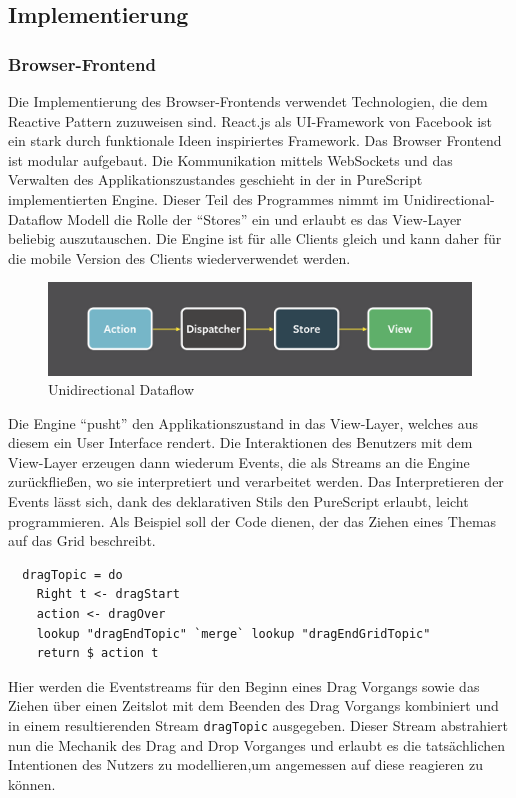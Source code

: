 \subsection{Implementierung}
\subsubsection{Browser-Frontend}
Die Implementierung des Browser-Frontends verwendet Technologien, die
dem Reactive Pattern zuzuweisen sind. React.js als UI-Framework von
Facebook ist ein stark durch funktionale Ideen inspiriertes Framework.
Das Browser Frontend ist modular aufgebaut. Die Kommunikation mittels
WebSockets und das Verwalten des Applikationszustandes geschieht in
der in PureScript implementierten Engine. Dieser Teil des Programmes
nimmt im Unidirectional-Dataflow Modell die Rolle der ``Stores'' ein
und erlaubt es das View-Layer beliebig auszutauschen. Die Engine ist
für alle Clients gleich und kann daher für die mobile Version des
Clients wiederverwendet werden.
\begin{figure}[h]
\includegraphics[scale=0.3]{img/Unidirectional.png}
\caption{Unidirectional Dataflow}
\end{figure}

\noindent Die Engine ``pusht'' den Applikationszustand in das
View-Layer, welches aus diesem ein User Interface rendert.
Die Interaktionen des Benutzers mit dem View-Layer erzeugen dann
wiederum Events, die als Streams an die Engine zurückfließen, wo sie
interpretiert und verarbeitet werden. Das Interpretieren der Events
lässt sich, dank des deklarativen Stils den PureScript erlaubt, leicht
programmieren. Als Beispiel soll der Code dienen, der das Ziehen eines
Themas auf das Grid beschreibt.

\begin{lstlisting}
  dragTopic = do
    Right t <- dragStart
    action <- dragOver
    lookup "dragEndTopic" `merge` lookup "dragEndGridTopic"
    return $ action t
\end{lstlisting}
\noindent Hier werden die Eventstreams für den Beginn eines
Drag Vorgangs sowie das Ziehen über einen Zeitslot mit dem Beenden des
Drag Vorgangs kombiniert und in einem resultierenden Stream \texttt{dragTopic}
ausgegeben. Dieser Stream abstrahiert nun die Mechanik des Drag and
Drop Vorganges und erlaubt es die tatsächlichen Intentionen des
Nutzers zu modellieren,um angemessen auf diese reagieren zu können.
